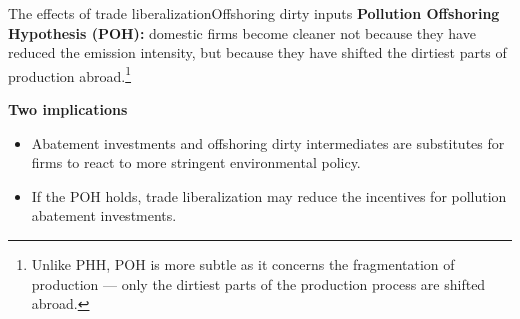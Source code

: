 \documentclass{beamer}
\begin{document}
\begin{frame}[label=poh]{The effects of trade liberalization}{Offshoring dirty inputs}
	\textbf{Pollution Offshoring Hypothesis (POH):} domestic firms become cleaner not because they have reduced the emission intensity, but because they have shifted the dirtiest parts of production abroad.\footnote{Unlike PHH, POH is more subtle as it concerns the fragmentation of production — only the dirtiest parts of the production process are shifted abroad.}\hfill\hyperlink{figure1}{}
	\medskip

	\textbf{Two implications}
	\begin{itemize}
		\item Abatement investments and offshoring dirty intermediates are substitutes for firms to react to more stringent environmental policy.
		\item If the POH holds, trade liberalization may reduce the incentives for pollution abatement investments.
	\end{itemize}
\end{frame}
\end{document}
